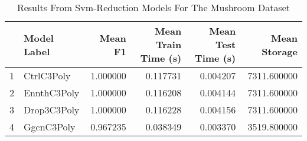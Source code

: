 \begin{table}
\centering
\caption{Results From Svm-Reduction Models For The Mushroom Dataset}
\label{tab:svm_reduction_results_mushroom}
\begin{tabular}{rlrrrr}
\toprule
 & Model Label & Mean F1 & Mean Train Time (s) & Mean Test Time (s) & Mean Storage \\
\midrule
1 & CtrlC3Poly & 1.000000 & 0.117731 & 0.004207 & 7311.600000 \\
2 & EnnthC3Poly & 1.000000 & 0.116208 & 0.004144 & 7311.600000 \\
3 & Drop3C3Poly & 1.000000 & 0.116228 & 0.004156 & 7311.600000 \\
4 & GgcnC3Poly & 0.967235 & 0.038349 & 0.003370 & 3519.800000 \\
\bottomrule
\end{tabular}
\end{table}
